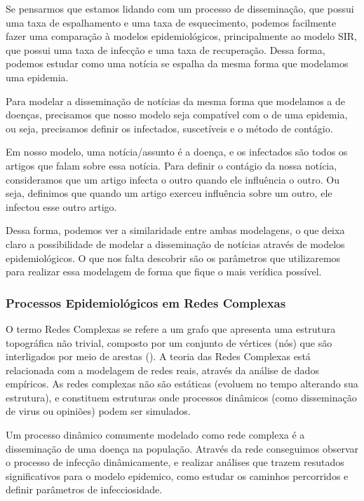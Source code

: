 \documentclass[a4paper,12pt]{article}
\begin{document}
Se pensarmos que estamos lidando com um processo de disseminação, que possui uma taxa de espalhamento e uma taxa de esquecimento, podemos
facilmente fazer uma comparação à modelos epidemiológicos, principalmente ao modelo SIR, que possui uma taxa de infecção e
uma taxa de recuperação. Dessa forma, podemos estudar como uma notícia se espalha da mesma forma que modelamos uma epidemia.

Para modelar a disseminação de notícias da mesma forma que modelamos a de doenças, precisamos
que nosso modelo seja compatível com o de uma epidemia, ou seja, precisamos definir os infectados, suscetíveis e o método de contágio.

Em nosso modelo, uma notícia/assunto é a doença, e os infectados são todos os artigos que falam sobre essa notícia. 
Para definir o contágio da nossa notícia, consideramos que um artigo infecta o outro quando ele influência o outro. Ou seja,
definimos que quando um artigo exerceu influência sobre um outro, ele infectou esse outro artigo. 

Dessa forma, podemos ver a similaridade entre ambas modelagens, o que deixa claro a possibilidade de modelar a disseminação de
notícias através de modelos epidemiológicos. O que nos falta descobrir são os parâmetros que utilizaremos para realizar essa modelagem
de forma que fique o mais verídica possível.

\subsubsection{Processos Epidemiológicos em Redes Complexas}

 O termo Redes Complexas se refere a um grafo que apresenta uma estrutura topográfica não trivial, composto por um conjunto
 de vértices (nós) que são interligados por meio de arestas (\cite{ravasz2003hierarchical}). A teoria das Redes Complexas  
 está relacionada com a modelagem de redes reais, através da 
 análise de dados empíricos. As redes complexas não são estáticas (evoluem no tempo alterando sua estrutura), e 
 constituem estruturas onde processos dinâmicos (como disseminação de virus ou opiniões) podem ser simulados.
 
 Um processo dinâmico comumente modelado como rede complexa é a disseminação de uma doença na população. Através da rede
 conseguimos observar o processo de infecção dinâmicamente, e realizar análises que trazem resutados significativos para o modelo epidemico,
 como estudar os caminhos percorridos e definir parâmetros de infecciosidade.
 
\end{document}
